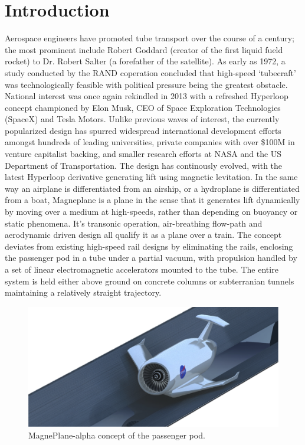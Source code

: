 \documentclass[heading.tex]{subfiles}
\begin{document}
\section{Introduction}

Aerospace engineers have promoted tube transport over the course of a century;
the most prominent include Robert Goddard \cite{Goddard} (creator of the first liquid fueld
rocket) to Dr. Robert Salter (a forefather of the satellite). As early as 1972,
a study conducted by the RAND coperation concluded that high-speed `tubecraft'
was technologically feasible with political pressure being the greatest
obstacle.\cite{RAND} National interest was once again rekindled in 2013 with a refreshed
Hyperloop concept championed by Elon Musk, CEO of Space Exploration
Technologies (SpaceX) and Tesla Motors.\cite{Musk}
Unlike previous waves of interest, the currently
popularized design has spurred widespread international development efforts
amongst hundreds of leading universities, private companies with over \$100M
in venture capitalist backing, and smaller research efforts at NASA and the
US Department of Transportation. \cite{Chin}
The design has continously evolved, with the latest Hyperloop derivative
generating lift using magnetic levitation.
In the same way an airplane is differentiated from an airship,
or a hydroplane is differentiated from a boat,
Magneplane is a plane in the sense that it generates lift dynamically
by moving over a medium at high-speeds,
rather than depending on buoyancy or static phenomena.
It's transonic operation, air-breathing flow-path and aerodynamic
driven design all qualify it as a plane over a train.
The concept deviates from existing high-speed rail designs by eliminating
the rails, enclosing the passenger pod in a tube under a partial vacuum,
with propulsion handled by a set of linear electromagnetic accelerators
mounted to the tube. The entire system is held either above ground on concrete
columns or subterranian tunnels maintaining a relatively straight trajectory.

\begin{figure}[hbtp]
\centering
\includegraphics[width=.85\textwidth]{images/MagnePlane.png}
 \caption[MagnePlane Concept Sketch]{MagnePlane-alpha concept of the passenger pod.}
\label{f:hyperloopSketch}
\end{figure}
\end{document}
